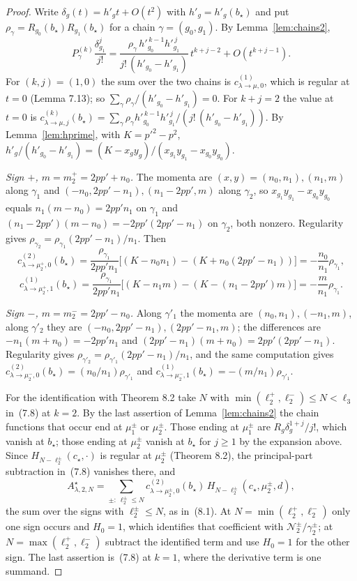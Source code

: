 \documentclass[11pt]{article}
\theoremstyle{remark}
\begin{document}
\begin{proof}
Write $\delta_g(t)=h'_gt+O(t^2)$ with $h'_g=h'_g(b_\star)$ and put
$\rho_\gamma=R_{g_0}(b_\star)R_{g_1}(b_\star)$ for a chain
$\gamma=(g_0,g_1)$.  By Lemma~\ref{lem:chains2},
\[
 P^{(k)}_\gamma\frac{\delta_{g_1}^j}{j!}
 =\frac{\rho_\gamma\,h'^{\,k-1}_{g_0}h'^{\,j}_{g_1}}{j!\,(h'_{g_0}-h'_{g_1})}\,
  t^{k+j-2}+O(t^{k+j-1}).
\]
For $(k,j)=(1,0)$ the sum over the two chains is $c^{(1)}_{\lambda\to\mu,0}$,
which is regular at $t=0$ (Lemma 7.13); so
$\sum_\gamma\rho_\gamma/(h'_{g_0}-h'_{g_1})=0$.  For $k+j=2$ the value at $t=0$
is
$c^{(k)}_{\lambda\to\mu,j}(b_\star)
=\sum_\gamma\rho_\gamma h'^{\,k-1}_{g_0}h'^{\,j}_{g_1}/(j!\,(h'_{g_0}-h'_{g_1}))$.
By Lemma~\ref{lem:hprime}, with $K=p'^2-p^2$, $h'_g/(h'_{g_0}-h'_{g_1})
=(K-x_gy_g)/(x_{g_1}y_{g_1}-x_{g_0}y_{g_0})$.

\emph{Sign $+$, $m=m^+_2=2pp'+n_0$.}  The momenta are
$(x,y)=(n_0,n_1),(n_1,m)$ along $\gamma_1$ and
$(-n_0,2pp'-n_1),(n_1-2pp',m)$ along $\gamma_2$, so
$x_{g_1}y_{g_1}-x_{g_0}y_{g_0}$ equals $n_1(m-n_0)=2pp'n_1$ on $\gamma_1$ and
$(n_1-2pp')(m-n_0)=-2pp'(2pp'-n_1)$ on $\gamma_2$, both nonzero.  Regularity
gives $\rho_{\gamma_2}=\rho_{\gamma_1}(2pp'-n_1)/n_1$.  Then
\[
 c^{(2)}_{\lambda\to\mu^+_2,0}(b_\star)
 =\frac{\rho_{\gamma_1}}{2pp'n_1}\bigl[(K-n_0n_1)-(K+n_0(2pp'-n_1))\bigr]
 =-\frac{n_0}{n_1}\rho_{\gamma_1},
\]
\[
 c^{(1)}_{\lambda\to\mu^+_2,1}(b_\star)
 =\frac{\rho_{\gamma_1}}{2pp'n_1}\bigl[(K-n_1m)-(K-(n_1-2pp')m)\bigr]
 =-\frac{m}{n_1}\rho_{\gamma_1}.
\]

\emph{Sign $-$, $m=m^-_2=2pp'-n_0$.}  Along $\gamma'_1$ the momenta are
$(n_0,n_1),(-n_1,m)$, along $\gamma'_2$ they are
$(-n_0,2pp'-n_1),(2pp'-n_1,m)$; the differences are $-n_1(m+n_0)=-2pp'n_1$ and
$(2pp'-n_1)(m+n_0)=2pp'(2pp'-n_1)$.  Regularity gives
$\rho_{\gamma'_2}=\rho_{\gamma'_1}(2pp'-n_1)/n_1$, and the same computation gives
$c^{(2)}_{\lambda\to\mu^-_2,0}(b_\star)=(n_0/n_1)\rho_{\gamma'_1}$ and
$c^{(1)}_{\lambda\to\mu^-_2,1}(b_\star)=-(m/n_1)\rho_{\gamma'_1}$.

For the identification with Theorem 8.2 take $N$ with
$\min(\ell^+_2,\ell^-_2)\le N<\ell_3$ in~(7.8) at $k=2$.  By the last assertion
of Lemma~\ref{lem:chains2} the chain functions that occur end at $\mu^\pm_1$ or
$\mu^\pm_2$.  Those ending at $\mu^\pm_1$ are $R_g\delta_g^{1+j}/j!$, which vanish
at $b_\star$; those ending at $\mu^\pm_2$ vanish at $b_\star$ for $j\ge1$ by the
expansion above.  Since $H_{N-\ell^\pm_2}(c_\star,\cdot)$ is regular at
$\mu^\pm_2$ (Theorem 8.2), the principal-part subtraction in~(7.8) vanishes
there, and
\[
 A^\star_{\lambda,2,N}=\sum_{\pm:\ \ell^\pm_2\le N}c^{(2)}_{\lambda\to\mu^\pm_2,0}(b_\star)
 \,H_{N-\ell^\pm_2}(c_\star,\mu^\pm_2,d),
\]
the sum over the signs with $\ell^\pm_2\le N$, as in~(8.1).  At
$N=\min(\ell^+_2,\ell^-_2)$ only one sign occurs and $H_0=1$, which identifies
that coefficient with $\mathcal N^\pm_2/\gamma^\pm_2$; at
$N=\max(\ell^+_2,\ell^-_2)$ subtract the identified term and use $H_0=1$ for the
other sign.  The last assertion is~(7.8) at $k=1$, where the derivative term is
one summand.
\end{proof}
\end{document}
